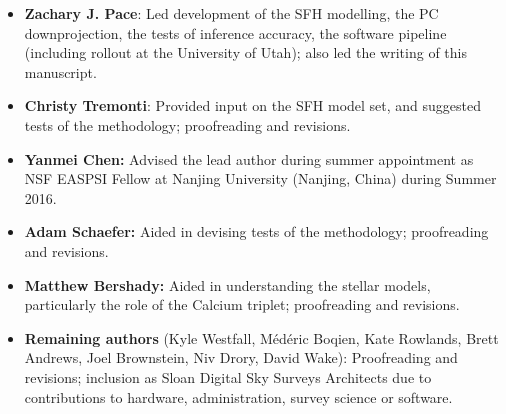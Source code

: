 \begin{itemize}
	\item \textbf{Zachary J. Pace}: Led development of the SFH modelling, the PC downprojection, the tests of inference accuracy, the software pipeline (including rollout at the University of Utah); also led the writing of this manuscript.
	\item \textbf{Christy Tremonti}: Provided input on the SFH model set, and suggested tests of the methodology; proofreading and revisions.
	\item \textbf{Yanmei Chen:} Advised the lead author during summer appointment as NSF EASPSI Fellow at Nanjing University (Nanjing, China) during Summer 2016.
	\item \textbf{Adam Schaefer:} Aided in devising tests of the methodology; proofreading and revisions.
	\item \textbf{Matthew Bershady:} Aided in understanding the stellar models, particularly the role of the Calcium triplet; proofreading and revisions.
	\item \textbf{Remaining authors} (Kyle Westfall, M\'{e}d\'{e}ric Boqien, Kate Rowlands, Brett Andrews, Joel Brownstein, Niv Drory, David Wake): Proofreading and revisions; inclusion as Sloan Digital Sky Surveys Architects due to contributions to hardware, administration, survey science or software.
\end{itemize}

\endchapappendix